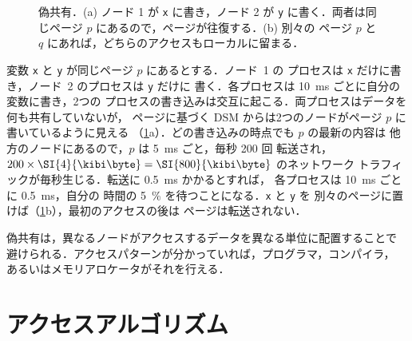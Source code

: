 \documentclass[../main.tex]{subfiles}
\begin{document}
\begin{figure}[htbp]
  \centering
  
  \caption{偽共有．(a) ノード 1 が \texttt{x} に書き，ノード 2 が \texttt{y}
    に書く．両者は同じページ $p$ にあるので，ページが往復する．(b) 別々の
    ページ $p$ と $q$ にあれば，どちらのアクセスもローカルに留まる．}
  \label{fig:l15-false-sharing}
\end{figure}

\begin{example}
  変数 \texttt{x} と \texttt{y} が同じページ $p$ にあるとする．ノード~1 の
  プロセスは \texttt{x} だけに書き，ノード~2 のプロセスは \texttt{y} だけに
  書く．各プロセスは \SI{10}{\milli\second} ごとに自分の変数に書き，2つの
  プロセスの書き込みは交互に起こる．両プロセスはデータを何も共有していないが，
  ページに基づく DSM からは2つのノードがページ $p$ に書いているように見える
  （\cref{fig:l15-false-sharing}a）．どの書き込みの時点でも $p$ の最新の内容は
  他方のノードにあるので，$p$ は \SI{5}{\milli\second} ごと，毎秒 200 回
  転送され，$200\times\SI{4}{\kibi\byte} = \SI{800}{\kibi\byte}$ のネットワーク
  トラフィックが毎秒生じる．転送に \SI{0.5}{\milli\second} かかるとすれば，
  各プロセスは \SI{10}{\milli\second} ごとに \SI{0.5}{\milli\second}，自分の
  時間の \SI{5}{\percent} を待つことになる．\texttt{x} と \texttt{y} を
  別々のページに置けば（\cref{fig:l15-false-sharing}b），最初のアクセスの後は
  ページは転送されない．
\end{example}

偽共有は，異なるノードがアクセスするデータを異なる単位に配置することで
避けられる．アクセスパターンが分かっていれば，プログラマ，コンパイラ，
あるいはメモリアロケータがそれを行える．

\section{アクセスアルゴリズム}
\label{sec:l15-access}
\end{document}

